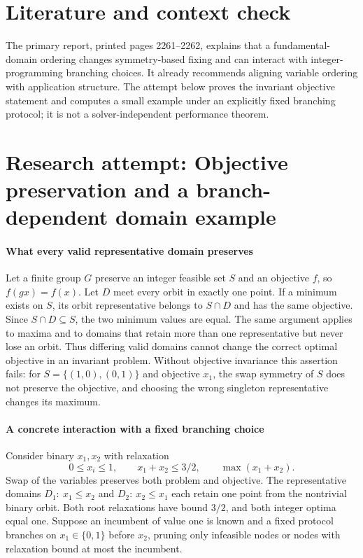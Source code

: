 \documentclass[11pt]{article}
\begin{document}
\section{Literature and context check}
The primary report, printed pages 2261--2262, explains that a fundamental-domain ordering changes symmetry-based fixing and can interact with integer-programming branching choices. It already recommends aligning variable ordering with application structure. The attempt below proves the invariant objective statement and computes a small example under an explicitly fixed branching protocol; it is not a solver-independent performance theorem.
\section{Research attempt: Objective preservation and a branch-dependent domain example}

\paragraph{What every valid representative domain preserves}
Let a finite group $G$ preserve an integer feasible set $S$ and an objective $f$, so $f(gx)=f(x)$. Let $D$ meet every orbit in exactly one point. If a minimum exists on $S$, its orbit representative belongs to $S\cap D$ and has the same objective. Since $S\cap D\subseteq S$, the two minimum values are equal. The same argument applies to maxima and to domains that retain more than one representative but never lose an orbit. Thus differing valid domains cannot change the correct optimal objective in an invariant problem. Without objective invariance this assertion fails: for $S=\{(1,0),(0,1)\}$ and objective $x_1$, the swap symmetry of $S$ does not preserve the objective, and choosing the wrong singleton representative changes its maximum.

\paragraph{A concrete interaction with a fixed branching choice}
Consider binary $x_1,x_2$ with relaxation
\[
 0\leq x_i\leq1,\qquad x_1+x_2\leq3/2,
 \qquad\max(x_1+x_2).
\]
Swap of the variables preserves both problem and objective. The representative domains $D_1:\ x_1\leq x_2$ and $D_2:\ x_2\leq x_1$ each retain one point from the nontrivial binary orbit. Both root relaxations have bound $3/2$, and both integer optima equal one. Suppose an incumbent of value one is known and a fixed protocol branches on $x_1\in\{0,1\}$ before $x_2$, pruning only infeasible nodes or nodes with relaxation bound at most the incumbent.
\end{document}
